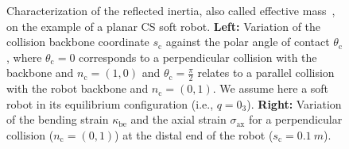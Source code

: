\begin{figure}[ht]
    \centering
    \caption{Characterization of the reflected inertia, also called effective mass~\citep{haddadin2009requirements, kirschner2021notion}, on the example of a planar \gls{CS} soft robot. 
    \textbf{Left:} Variation of the collision backbone coordinate $s_\mathrm{c}$ against the polar angle of contact $\theta_\mathrm{c}$, where $\theta_\mathrm{c} = 0$ corresponds to a perpendicular collision with the backbone and $n_\mathrm{c} = (1, 0)$ and $\theta_\mathrm{c} = \frac{\pi}{2}$ relates to a parallel collision with the robot backbone and $n_\mathrm{c} = (0,1)$. We assume here a soft robot in its equilibrium configuration (i.e., $q = 0_3$).
    \textbf{Right:} Variation of the bending strain $\kappa_\mathrm{be}$ and the axial strain $\sigma_\mathrm{ax}$ for a perpendicular collision ($n_\mathrm{c} = (0,1)$) at the distal end of the robot ($s_\mathrm{c} = \SI{0.1}{m}$).
    }
    \label{fig:safetymetric:planar_cs_reflected_inertia_characterization}
    \vspace{-0.2cm}
\end{figure}

